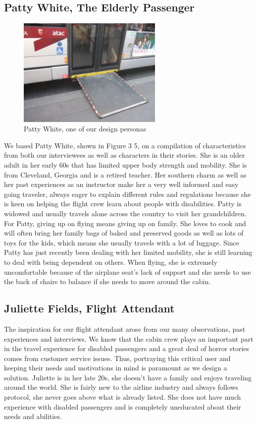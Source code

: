 \documentclass[a4paper, 12pt,conference]{new_cit_thesis}
\begin{document}
\subsection{Patty White, The Elderly Passenger}

\begin{figure}[h]
  \centering
     \includegraphics[width=7cm]{images/image041}
   \caption{Patty White, one of our design personas}
  \label{fig:41}
\end{figure}

We based Patty White, shown in Figure 3 5, on a compilation of characteristics from both our interviewees as well as characters in their stories. She is an older adult in her early 60s that has limited upper body strength and mobility. She is from Cleveland, Georgia and is a retired teacher. Her southern charm as well as her past experiences as an instructor make her a very well informed and easy going traveler, always eager to explain different rules and regulations because she is keen on helping the flight crew learn about people with disabilities. Patty is widowed and usually travels alone across the country to visit her grandchildren. For Patty, giving up on flying means giving up on family. She loves to cook and will often bring her family bags of baked and preserved goods as well as lots of toys for the kids, which means she usually travels with a lot of luggage.  Since Patty has just recently been dealing with her limited mobility, she is still learning to deal with being dependent on others. When flying, she is extremely uncomfortable because of the airplane seat’s lack of support and she needs to use the back of chairs to balance if she needs to move around the cabin.

\subsection{Juliette Fields, Flight Attendant}

The inspiration for our flight attendant arose from our many observations, past experiences and interviews. We know that the cabin crew plays an important part in the travel experience for disabled passengers and a great deal of horror stories comes from customer service issues. Thus, portraying this critical user and keeping their needs and motivations in mind is paramount as we design a solution. Juliette is in her late 20s, she doesn’t have a family and enjoys traveling around the world. She is fairly new to the airline industry and always follows protocol, she never goes above what is already listed. She does not have much experience with disabled passengers and is completely uneducated about their needs and abilities. 
\end{document}
